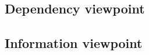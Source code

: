 \subsection{Dependency viewpoint}

% 
% 
% 
% 
% 
% 
% 
% 
% 
% 
% 

\subsection{Information viewpoint}

